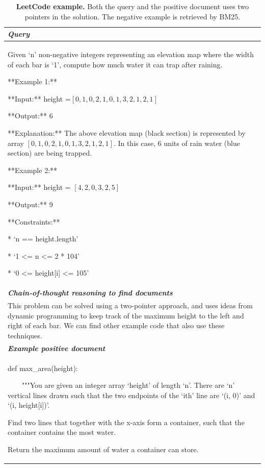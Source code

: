 
\begin{table}[ht]
\caption{\textbf{LeetCode example.} Both the query and the positive document uses two pointers in the solution. The negative example is retrieved by BM25.}
\centering
\begin{tabular}{p{13cm}}
\toprule
\textit{\textbf{Query}} \\
\midrule
Given `n' non-negative integers representing an elevation map where the width of each bar is `1', compute how much water it can trap after raining.

**Example 1:**

**Input:** height =$[0,1,0,2,1,0,1,3,2,1,2,1]$

**Output:** 6

**Explanation:** The above elevation map (black section) is represented by array $[0,1,0,2,1,0,1,3,2,1,2,1]$. In this case, 6 units of rain water (blue section) are being trapped.

**Example 2:**

**Input:** height = $[4,2,0,3,2,5]$

**Output:** 9

**Constraints:**

*   `n == height.length'

*   `1 <= n <= 2 * 104'

*   `0 <= height[i] <= 105'\\
\midrule
\textit{\textbf{Chain-of-thought reasoning to find documents}} \\
\midrule
This problem can be solved using a two-pointer approach, and uses ideas from dynamic programming to keep track of the maximum height to the left and right of each bar.
We can find other example code that also use these techniques. \\
\midrule
\textit{\textbf{Example positive document}} \\
\midrule
def max\_area(height): 

~~~~"""You are given an integer array `height' of length `n'. There are `n' vertical lines drawn such that the two endpoints of the `ith' line are `(i, 0)' and `(i, height[i])'.
    
    Find two lines that together with the x-axis form a container, such that the container contains the most water.
    
    Return the maximum amount of water a container can store.
    

\end{tabular}
\end{table}
